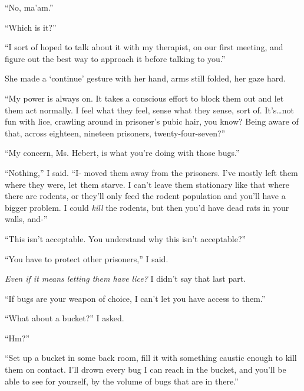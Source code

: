 ``No, ma'am.''



``Which is it?''



``I sort of hoped to talk about it with my therapist, on our first meeting, and figure out the best way to approach it before talking to you.''



She made a `continue' gesture with her hand, arms still folded, her gaze hard.



``My power is always on.  It takes a conscious effort to block them out and let them act normally.  I feel what they feel, sense what they sense, sort of.  It's\ldots not fun with lice, crawling around in prisoner's pubic hair, you know?  Being aware of that, across eighteen, nineteen prisoners, twenty-four-seven?''



``My concern, Ms. Hebert, is what you're doing with those bugs.''



``Nothing,'' I said.  ``I- moved them away from the prisoners.  I've mostly left them where they were, let them starve.  I can't leave them stationary like that where there are rodents, or they'll only feed the rodent population and you'll have a bigger problem.  I could \emph{kill} the rodents, but then you'd have dead rats in your walls, and-''



``This isn't acceptable.  You understand why this isn't acceptable?''



``You have to protect other prisoners,'' I said.



\emph{Even if it means letting them have lice?  }I didn't say that last part.



``If bugs are your weapon of choice, I can't let you have access to them.''



``What about a bucket?'' I asked.



``Hm?''



``Set up a bucket in some back room, fill it with something caustic enough to kill them on contact.  I'll drown every bug I can reach in the bucket, and you'll be able to see for yourself, by the volume of bugs that are in there.''



